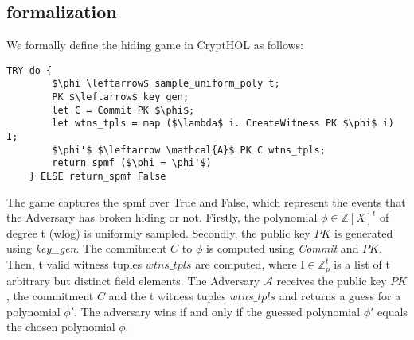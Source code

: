 \subsection{formalization}
We formally define the hiding game in CryptHOL as follows:
\begin{lstlisting}[language=isabelle]
    TRY do {
        $\phi \leftarrow$ sample_uniform_poly t;
        PK $\leftarrow$ key_gen;
        let C = Commit PK $\phi$;
        let wtns_tpls = map ($\lambda$ i. CreateWitness PK $\phi$ i) I;
        $\phi'$ $\leftarrow \mathcal{A}$ PK C wtns_tpls;
        return_spmf ($\phi = \phi'$)
    } ELSE return_spmf False
\end{lstlisting}
The game captures the spmf over True and False, which represent the events that the Adversary has broken hiding or not.
Firstly, the polynomial $\phi\in\mathbb{Z}[X]^t$ of degree t (wlog) is uniformly sampled.
Secondly, the public key $PK$ is generated using \textit{key\_gen}. 
The commitment $C$ to $\phi$ is computed using \textit{Commit} and $PK$. Then, t valid witness tuples $wtns\_tpls$ are computed, where $\text{I}\in\mathbb{Z}_p^t$ is a list of t arbitrary but distinct field elements.
The Adversary $\mathcal{A}$ receives the public key $PK$, the commitment $C$ and the t witness tuples $wtns\_tpls$ and returns a guess for a polynomial $\phi'$.
The adversary wins if and only if the guessed polynomial $\phi'$ equals the chosen polynomial $\phi$.

